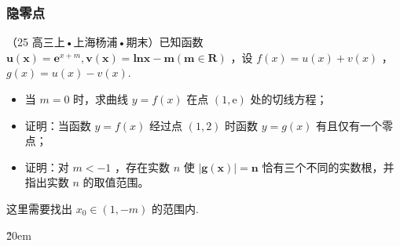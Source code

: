 \newpage

\subsubsection{隐零点}

\begin{example}
    （25 高三上•上海杨浦•期末）已知函数 $\boldsymbol{u}(\boldsymbol{x})=\boldsymbol{e}^{x+m}, \boldsymbol{v}(\boldsymbol{x})=\boldsymbol{l} \boldsymbol{n} \boldsymbol{x}-\boldsymbol{m}(\boldsymbol{m} \in \boldsymbol{R})$ ，设 $f(x)=u(x)+v(x)$ ， $g(x)=u(x)-v(x)$.
    \begin{itemize}
        \item 当 $m=0$ 时，求曲线 $y=f(x)$ 在点 $(1, \mathrm{e})$ 处的切线方程；
        \item 证明：当函数 $y=f(x)$ 经过点 $(1,2)$ 时函数 $y=g(x)$ 有且仅有一个零点；
        \item 证明：对 $m<-1$ ，存在实数 $n$ 使 $|\boldsymbol{g}(\boldsymbol{x})|=\boldsymbol{n}$ 恰有三个不同的实数根，并指出实数 $n$ 的取值范围。
    \end{itemize}
\end{example}

\begin{tips}
    这里需要找出 $x_0 \in (1, -m)$ 的范围内.
\end{tips}

\v{20em}

